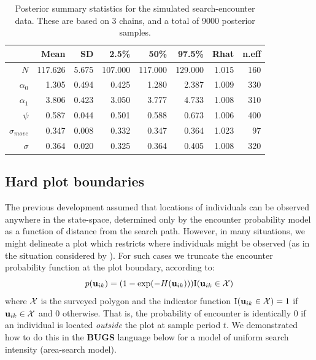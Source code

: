 \begin{table}[ht]
\caption{Posterior summary statistics for the simulated
  search-encounter data. These are based on 3 chains, 
and a total of 9000 posterior samples. 
}
\begin{tabular}{rrrrrrrr} \hline \hline
                & Mean     & SD     & 2.5\%    & 50\%     & 97.5\%   & Rhat  & n.eff \\ \hline
$N$             & 117.626  & 5.675  & 107.000  & 117.000  & 129.000  & 1.015 & 160   \\
$\alpha_0$      & 1.305    & 0.494  & 0.425    & 1.280    & 2.387    & 1.009 & 330   \\
$\alpha_1$      & 3.806    & 0.423  & 3.050    & 3.777    & 4.733    & 1.008 & 310   \\
$\psi$         & 0.587    & 0.044  & 0.501    & 0.588    & 0.673    & 1.006 & 400   \\
$\sigma_{move}$  & 0.347    & 0.008  & 0.332    & 0.347    & 0.364    & 1.023 & 97    \\
$\sigma$       & 0.364  &  0.020 &  0.325     &  0.364   & 0.405    &
1.008 & 320 \\  \hline
\end{tabular}
\label{searchencounter.tab.simtable}
\end{table}


\subsection{Hard plot boundaries}

The previous development assumed that locations of individuals can be
observed anywhere in the state-space, determined only by the encounter
probability model as a function of distance from the search path.
However, in many situations, we might delineate a plot which restricts
where individuals might be observed (as in the situation considered by
\citet{royle_young:2008}).  For such cases we truncate the encounter
probability function at the plot boundary, according to:
\begin{equation}
p({\bf u}_{ik}) = (1- \exp(-H({\bf u}_{ik}))) \mbox{I}({\bf u}_{ik} \in {\cal X})
\label{search-encounter.eq.hardplot}
\end{equation}
where ${\cal X}$ is the surveyed polygon and the indicator function
$\mbox{I}({\bf u}_{ik} \in {\cal X}) = 1$ if ${\bf u}_{ik} \in {\cal
  X}$ and 0 otherwise.  That is, the probability of encounter is
identically 0 if an individual is located {\it outside} the plot at
sample period $t$.  We demonstrated how to do this in the {\bf BUGS}
language below for a model of uniform search intensity (area-search
model).


